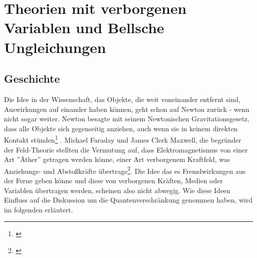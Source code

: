 \section{Theorien mit verborgenen Variablen und Bellsche Ungleichungen}
\label{sec:theorien_mit_verborgenen_variablen_bellsche_ungleichungen}


\subsection{Geschichte}
\label{subsec:geschichte}

Die Idee in der Wissenschaft, das Objekte, die weit voneinander entfernt sind, Auswirkungen auf einander haben können, geht schon auf Newton zurück - wenn nicht sogar weiter. Newton besagte mit seinem Newtonischen Gravitationsgesetz, dass alle Objekte sich gegenseitig anziehen, auch wenn sie in keinem direkten Kontakt stünden\footnote{\cite{newton_gravitation_2009}} . Michael Faraday und James Clerk Maxwell, die begründer der Feld-Theorie stellten die Vermutung auf, dass Elektromagnetismus
von einer Art ''Äther'' getragen werden könne, einer Art verborgenem Kraftfeld, was Anziehungs- und Abstoßkräfte übertrage\footnote{\cite{faraday_maxwell_ether}}. Die Idee das es Fremdwirkungen aus der Ferne geben könne und diese von verborgenen
Kräften, Medien oder Variablen übertragen werden, scheinen also nicht abwegig. Wie diese Ideen Einfluss auf die Diskussion um die Quantenverschränkung genommen haben, wird im folgenden erläutert. \\

